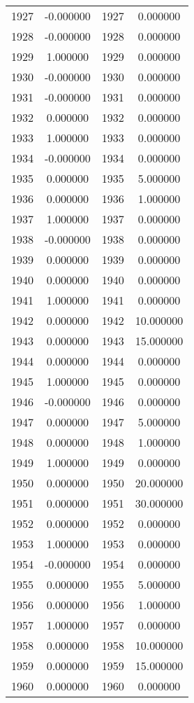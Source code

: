 \documentclass[12pt]{article}
\begin{document}
\begin{longtable}{@{}cccc@{}}
1927 & -0.000000 & 1927 & 0.000000 \\
1928 & -0.000000 & 1928 & 0.000000 \\
1929 & 1.000000 & 1929 & 0.000000 \\
1930 & -0.000000 & 1930 & 0.000000 \\
1931 & -0.000000 & 1931 & 0.000000 \\
1932 & 0.000000 & 1932 & 0.000000 \\
1933 & 1.000000 & 1933 & 0.000000 \\
1934 & -0.000000 & 1934 & 0.000000 \\
1935 & 0.000000 & 1935 & 5.000000 \\
1936 & 0.000000 & 1936 & 1.000000 \\
1937 & 1.000000 & 1937 & 0.000000 \\
1938 & -0.000000 & 1938 & 0.000000 \\
1939 & 0.000000 & 1939 & 0.000000 \\
1940 & 0.000000 & 1940 & 0.000000 \\
1941 & 1.000000 & 1941 & 0.000000 \\
1942 & 0.000000 & 1942 & 10.000000 \\
1943 & 0.000000 & 1943 & 15.000000 \\
1944 & 0.000000 & 1944 & 0.000000 \\
1945 & 1.000000 & 1945 & 0.000000 \\
1946 & -0.000000 & 1946 & 0.000000 \\
1947 & 0.000000 & 1947 & 5.000000 \\
1948 & 0.000000 & 1948 & 1.000000 \\
1949 & 1.000000 & 1949 & 0.000000 \\
1950 & 0.000000 & 1950 & 20.000000 \\
1951 & 0.000000 & 1951 & 30.000000 \\
1952 & 0.000000 & 1952 & 0.000000 \\
1953 & 1.000000 & 1953 & 0.000000 \\
1954 & -0.000000 & 1954 & 0.000000 \\
1955 & 0.000000 & 1955 & 5.000000 \\
1956 & 0.000000 & 1956 & 1.000000 \\
1957 & 1.000000 & 1957 & 0.000000 \\
1958 & 0.000000 & 1958 & 10.000000 \\
1959 & 0.000000 & 1959 & 15.000000 \\
1960 & 0.000000 & 1960 & 0.000000 \\

\end{longtable}
\end{document}
